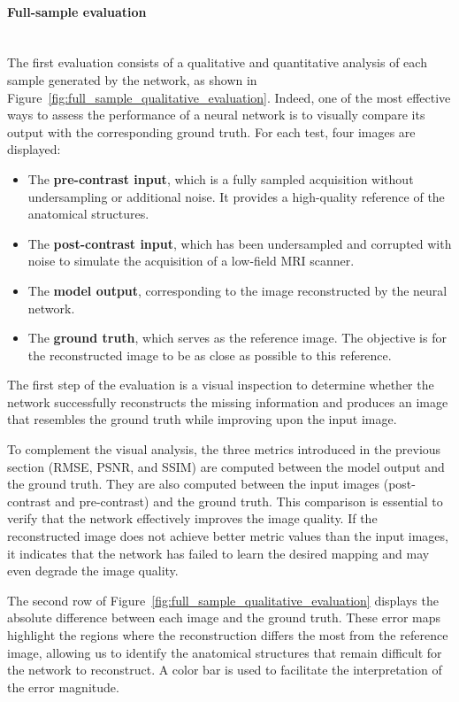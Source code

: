 \documentclass[12pt]{article}
\begin{document}
\paragraph{Full-sample evaluation}
\mbox{}\\

The first evaluation consists of a qualitative and quantitative analysis of each sample generated by the network, as shown in Figure~\ref{fig:full_sample_qualitative_evaluation}.
Indeed, one of the most effective ways to assess the performance of a neural network is to visually compare its output with the corresponding ground truth.
For each test, four images are displayed:
\begin{itemize}
    \item The \textbf{pre-contrast input}, which is a fully sampled acquisition without undersampling or additional noise.
    It provides a high-quality reference of the anatomical structures.
    \item The \textbf{post-contrast input}, which has been undersampled and corrupted with noise to simulate the acquisition of a low-field MRI scanner.
    \item The \textbf{model output}, corresponding to the image reconstructed by the neural network.
    \item The \textbf{ground truth}, which serves as the reference image. 
    The objective is for the reconstructed image to be as close as possible to this reference.
\end{itemize}

The first step of the evaluation is a visual inspection to determine whether the network successfully reconstructs the missing information and produces an image that resembles the ground truth while improving upon the input image.
\vspace{0.5cm}

To complement the visual analysis, the three metrics introduced in the previous section (RMSE, PSNR, and SSIM) are computed between the model output and the ground truth. 
They are also computed between the input images (post-contrast and pre-contrast) and the ground truth. 
This comparison is essential to verify that the network effectively improves the image quality. 
If the reconstructed image does not achieve better metric values than the input images, it indicates that the network has failed to learn the desired mapping and may even degrade the image quality.
\vspace{0.5cm}

The second row of Figure~\ref{fig:full_sample_qualitative_evaluation} displays the absolute difference between each image and the ground truth.
These error maps highlight the regions where the reconstruction differs the most from the reference image, allowing us to identify the anatomical structures that remain difficult for the network to reconstruct. 
A color bar is used to facilitate the interpretation of the error magnitude.
\vspace{0.5cm}
\end{document}
